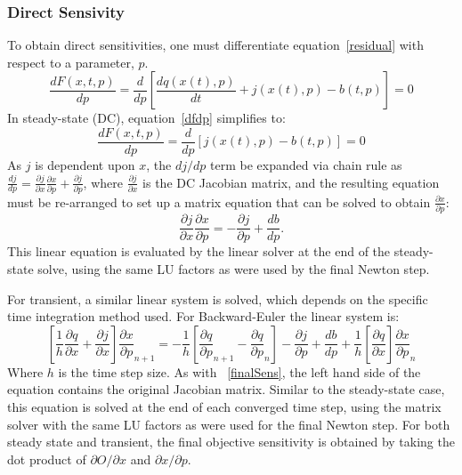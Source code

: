 \subsubsection{Direct Sensivity}
To obtain direct sensitivities, one must differentiate equation~\ref{residual} with
respect to a parameter, $p$.
\begin{equation}
  \frac{dF(x,t,p)}{dp} = \frac{d}{dp}\left[ \frac{d q(x(t),p)}{dt} + j(x(t),p) - b(t,p) \right] = 0 
  \label{dfdp}
\end{equation}
In steady-state (DC), equation~\ref{dfdp} simplifies to:
\begin{equation}
  \frac{dF(x,t,p)}{dp} = \frac{d}{dp}\left[ j(x(t),p) - b(t,p) \right] = 0 
  \label{steady_dfdp}
\end{equation}
\noindent As $j$ is dependent upon $x$, the $dj/dp$ term  
be expanded via chain rule as $\frac{dj}{dp} = \frac{\partial j}{\partial x}\frac{\partial x}{\partial p} + \frac{\partial j}{\partial p}$, where $\frac{\partial j}{\partial x}$ is the DC Jacobian matrix,
and the resulting equation must be re-arranged to set up a matrix equation that can be solved to obtain
$\frac{\partial x}{\partial p}$:
\begin{equation}
  \frac{\partial j}{\partial x}\frac{\partial x}{\partial p} = - \frac{\partial j}{\partial p} + \frac{db}{dp}.
  \label{finalSens}
\end{equation}
This linear equation is evaluated by the linear solver at the end of the steady-state solve, using the same LU factors as were used by the final Newton step.

For transient, a similar linear system is solved, which depends on the specific time integration
method used.  For Backward-Euler the linear system is:
\begin{equation}
  \left[ \frac{1}{h} \frac{\partial q}{\partial x} 
  + \frac{\partial j}{\partial x} \right] \frac{\partial x}{\partial p}_{n+1} 
 =
  -\frac{1}{h} \left[ \frac{\partial q}{\partial p}_{n+1} - \frac{\partial q}{\partial p}_n \right] 
 - \frac{\partial j}{\partial p} 
 + \frac{db}{dp} 
 + \frac{1}{h} \left[ \frac{\partial q}{\partial x} \right] \frac{\partial x}{\partial p}_n 
 \label{finalTransientSens}
\end{equation}
\noindent Where $h$ is the time step size.  As with ~\ref{finalSens},
the left hand side of the equation contains the original Jacobian
matrix.  Similar to the steady-state case, this equation is solved at the end of each converged time step, using the matrix solver with the same LU factors as were used for the final Newton step.
For both steady state and transient, the final objective sensitivity is obtained by 
taking the dot product of $\partial O/\partial x$ and $\partial x/\partial p$.

